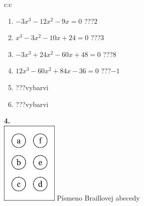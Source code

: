 \documentclass[10pt]{report}
\begin{document}
\begin{tabular}{c:c}
\begin{minipage}[c][104.5mm][t]{0.5\linewidth}
\begin{center}
\begin{minipage}{0.79\linewidth}
\begin{center}
\begin{varwidth}{\linewidth}
\begin{enumerate}
\Large
\item $-3x^3-12x^2-9x=0$\quad \dotfill\; ???\;\dotfill \quad $2$
\item $x^3-3x^2-10x+24=0$\quad \dotfill\; ???\;\dotfill \quad $3$
\item $-3x^3+24x^2-60x+48=0$\quad \dotfill\; ???\;\dotfill \quad $8$
\item $12x^3-60x^2+84x-36=0$\quad \dotfill\; ???\;\dotfill \quad $-1$
\item \quad \dotfill\; ???\;\dotfill \quad vybarvi
\item \quad \dotfill\; ???\;\dotfill \quad vybarvi
\end{enumerate}
\end{varwidth}
\end{center}
\end{minipage}
\begin{minipage}{0.20\linewidth}
\begin{center}
{\Huge\bfseries 4.} \\[2mm]
\includegraphics[height=40mm]{../images/braille.png}
{\small Písmeno Braillovej abecedy}
\end{center}
\end{minipage}
\end{center}
\end{minipage}
%
\end{tabular}
\newpage
\thispagestyle{empty}
\end{document}

